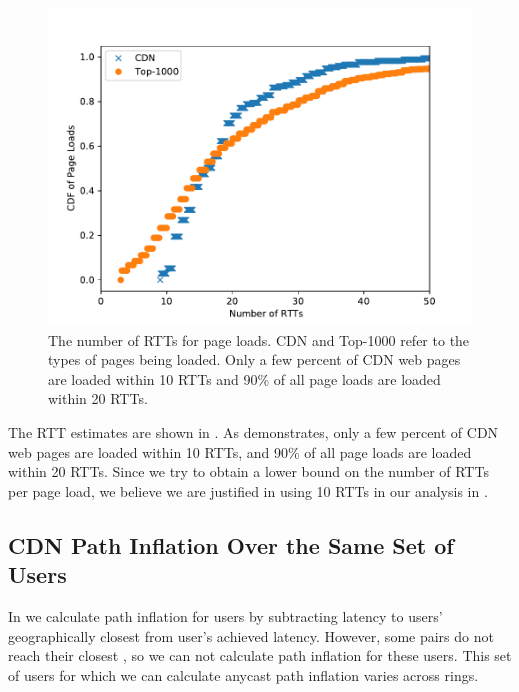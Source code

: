 \documentclass[sigconf,letterpaper,nonacm,10pt,anonymous]{acmart}
\begin{document}
\begin{figure}
    \centering
    \includegraphics[width=\linewidth]{figures/rtts_per_page_load.pdf}
    \caption{The number of RTTs for page loads. CDN and Top-1000 refer to the types of pages being loaded. Only a few percent of CDN web pages are loaded within 10 RTTs and 90\% of all page loads are loaded within 20 RTTs.}
    \label{fig:rtts_per_page_load}
\end{figure}

The RTT estimates are shown in . As
 demonstrates, only a few percent of CDN
web pages are loaded within 10 RTTs, and 90\% of all page loads are
loaded within 20 RTTs. Since we try to obtain a lower bound on the
number of RTTs per page load, we believe we are justified in using 10
RTTs in our analysis in .

\subsection{CDN Path Inflation Over the Same Set of
Users}\label{cdn-path-inflation-over-the-same-set-of-users}

\label{ap:anycast_cdn_path_inflation_recalc}

In  we calculate path inflation for
users by subtracting latency to users' geographically closest
\feplural from user's achieved latency. However, some \metroas pairs do
not reach their closest \fe, so we can not calculate path inflation for
these users. This set of users for which we can calculate anycast path
inflation varies across rings.
\end{document}

